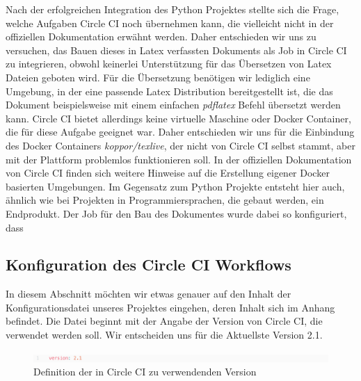 \documentclass[11pt]{article}
\begin{document}
Nach der erfolgreichen Integration des Python Projektes stellte sich die Frage, welche Aufgaben Circle CI noch übernehmen kann, die vielleicht nicht in der offiziellen Dokumentation erwähnt werden. Daher entschieden wir uns zu versuchen, das Bauen dieses in Latex verfassten Dokuments als Job in Circle CI zu integrieren, obwohl keinerlei Unterstützung für das Übersetzen von Latex Dateien geboten wird. Für die Übersetzung benötigen wir lediglich eine Umgebung, in der eine passende Latex Distribution bereitgestellt ist, die das Dokument beispielsweise mit einem einfachen \textit{pdflatex} Befehl übersetzt werden kann. Circle CI bietet allerdings keine virtuelle Maschine oder Docker Container, die für diese Aufgabe geeignet war. Daher entschieden wir uns für die Einbindung des Docker Containers \textit{koppor/texlive}, der nicht von Circle CI selbst stammt, aber mit der Plattform problemlos funktionieren soll. In der offiziellen Dokumentation von Circle CI finden sich weitere Hinweise auf die Erstellung eigener Docker basierten Umgebungen. Im Gegensatz zum Python Projekte entsteht hier auch, ähnlich wie bei Projekten in Programmiersprachen, die gebaut werden, ein Endprodukt. Der Job für den Bau des Dokumentes wurde dabei so konfiguriert, dass 

\subsection{Konfiguration des Circle CI Workflows}
In diesem Abschnitt möchten wir etwas genauer auf den Inhalt der Konfigurationsdatei unseres Projektes eingehen, deren Inhalt sich im Anhang befindet. Die Datei beginnt mit der Angabe der Version von Circle CI, die verwendet werden soll. Wir entscheiden uns für die Aktuellste Version 2.1.

\begin{figure}[H]
	\centering
  	\includegraphics[width=1\linewidth]{../Images/Config/Version}
  	\caption{Definition der in Circle CI zu verwendenden Version}
  	\label{fig:version}
\end{figure}
\end{document}
